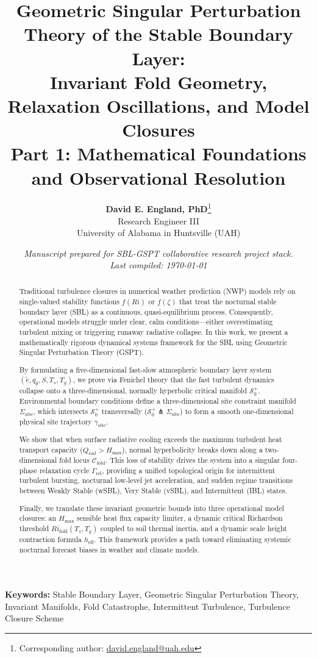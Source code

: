\documentclass[11pt,a4paper]{article}
\title{\textbf{Geometric Singular Perturbation Theory of the Stable Boundary Layer:\\ Invariant Fold Geometry, Relaxation Oscillations, and Model Closures}\\
\large Part 1: Mathematical Foundations and Observational Resolution}
\author{
    \textbf{David E. England, PhD}\thanks{Corresponding author: \href{mailto:david.england@uah.edu}{david.england@uah.edu}} \\
    \small Research Engineer III \\
    \small University of Alabama in Huntsville (UAH)
}
\date{\small\itshape Manuscript prepared for SBL-GSPT collaborative research project stack. \\ Last compiled: \today}
\theoremstyle{plain}
\theoremstyle{definition}
\theoremstyle{remark}
\begin{document}
\maketitle

\begin{abstract}
Traditional turbulence closures in numerical weather prediction (NWP) models rely on single-valued stability functions $f(Ri)$ or $f(\zeta)$ that treat the nocturnal stable boundary layer (SBL) as a continuous, quasi-equilibrium process. Consequently, operational models struggle under clear, calm conditions—either overestimating turbulent mixing or triggering runaway radiative collapse. In this work, we present a mathematically rigorous dynamical systems framework for the SBL using Geometric Singular Perturbation Theory (GSPT).

By formulating a five-dimensional fast-slow atmospheric boundary layer system $(\tilde e, q_\theta, S, T_s, T_g)$, we prove via Fenichel theory that the fast turbulent dynamics collapse onto a three-dimensional, normally hyperbolic critical manifold $\mathcal{S}_0^+$. Environmental boundary conditions define a three-dimensional site constraint manifold $\Sigma_{\mathrm{site}}$, which intersects $\mathcal{S}_0^+$ transversally ($\mathcal{S}_0^+ \pitchfork \Sigma_{\mathrm{site}}$) to form a smooth one-dimensional physical site trajectory $\gamma_{\mathrm{site}}$.

We show that when surface radiative cooling exceeds the maximum turbulent heat transport capacity ($Q_{\mathrm{rad}} > H_{\max}$), normal hyperbolicity breaks down along a two-dimensional fold locus $\mathcal{C}_{\mathrm{fold}}$. This loss of stability drives the system into a singular four-phase relaxation cycle $\Gamma_{\mathrm{rel}}$, providing a unified topological origin for intermittent turbulent bursting, nocturnal low-level jet acceleration, and sudden regime transitions between Weakly Stable (wSBL), Very Stable (vSBL), and Intermittent (IBL) states.

Finally, we translate these invariant geometric bounds into three operational model closures: an $H_{\max}$ sensible heat flux capacity limiter, a dynamic critical Richardson threshold $Ri_{\mathrm{fold}}(T_s, T_g)$ coupled to soil thermal inertia, and a dynamic scale height contraction formula $h_{\mathrm{eff}}$. This framework provides a path toward eliminating systemic nocturnal forecast biases in weather and climate models.
\end{abstract}

\noindent\textbf{Keywords:} Stable Boundary Layer, Geometric Singular Perturbation Theory, Invariant Manifolds, Fold Catastrophe, Intermittent Turbulence, Turbulence Closure Scheme

\newpage









\appendix






\end{document}
